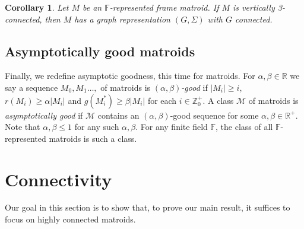 \documentclass[12pt]{amsart}
\newtheorem{corollary}[theorem]{Corollary}
\theoremstyle{definition}
\newcommand{\bF}{\mathbb F}
\newcommand{\bR}{\mathbb R}
\newcommand{\bZ}{\mathbb Z}
\newcommand{\cM}{\mathcal{M}}
\begin{document}
   \begin{corollary}\label{cor:graphconn}
     Let $M$ be an $\bF$-represented frame matroid. If $M$ is vertically 3-connected, then $M$ has a graph representation $(G,\Sigma)$ with $G$ connected.
   \end{corollary}

   
  \subsection*{Asymptotically good matroids} Finally, we redefine asymptotic goodness, this time for matroids. For $\alpha,\beta \in \bR$ we say a sequence $M_0,M_1 \dotsc,$ of matroids is \emph{$(\alpha,\beta)$-good} if $|M_i| \ge i$, $r(M_i) \ge \alpha |M_i|$ and $g(M_i^*) \ge \beta|M_i|$ for each $i \in \bZ_0^+$. A class $\cM$ of matroids is \emph{asymptotically good} if $\cM$ contains an $(\alpha,\beta)$-good sequence for some $\alpha,\beta \in \bR^+$. Note that $\alpha,\beta \le 1$ for any such $\alpha,\beta$. For any finite field $\bF$, the class of  all $\bF$-represented matroids is such a class.
  
   
  \section{Connectivity}
  Our goal in this section is to show that, to prove our main result, it suffices to focus on highly connected matroids.
    
\end{document}
